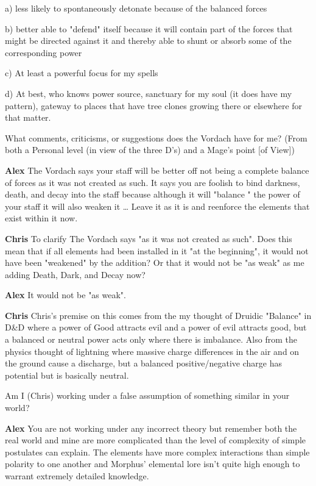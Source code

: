 a) less likely to spontaneously detonate because of the balanced forces

b) better able to "defend" itself because it will contain part of the forces 
that might be directed against it and 
thereby able to shunt or absorb some of the corresponding power 

c) At least a powerful focus for my spells

d) At best, who knows power source, sanctuary for my soul (it does have my pattern), gateway to places that have tree clones growing there or elsewhere for that matter.

What comments, criticisms, or suggestions does the Vordach have for me? 
(From both a Personal level (in view of the three D's) 
and a Mage's point [of View])

{\bf Alex }	
The Vordach says your staff will be better off not being a complete balance 
of forces as it was not created as such. It says you are foolish to bind 
darkness, death, and decay into the staff because although it will 
"balance " the power of your staff\- it will also weaken it \dots 
Leave it as it is and re\-enforce the elements that exist within it now.

{\bf Chris} 
To clarify The Vordach says "as it was not created as such". Does this mean 
that if all elements had been installed in it "at the beginning", it would not 
have been "weakened" by the addition? Or that it would not be "as weak" as me 
adding Death, Dark, and Decay now? 

{\bf Alex }
It would not be "as weak". 

{\bf Chris} 
Chris's premise on this comes from the my thought of Druidic "Balance" in 
D\&D where a power of Good attracts evil and a power of evil attracts good, 
but a balanced or neutral power acts only where there is imbalance. 
Also from the physics thought of lightning where massive charge 
differences in the air and on the ground cause a discharge, 
but a balanced positive/negative charge has potential but is 
basically neutral. 

Am I (Chris) working under a false assumption of something similar in your 
world?

{\bf Alex }
You are not working under any incorrect theory\- but remember\- both the 
real world and mine are more complicated than the level of complexity of 
simple postulates can explain. The elements have more complex interactions 
than simple polarity to one another\- and Morphus' elemental lore isn't 
quite high enough to warrant extremely detailed knowledge.

